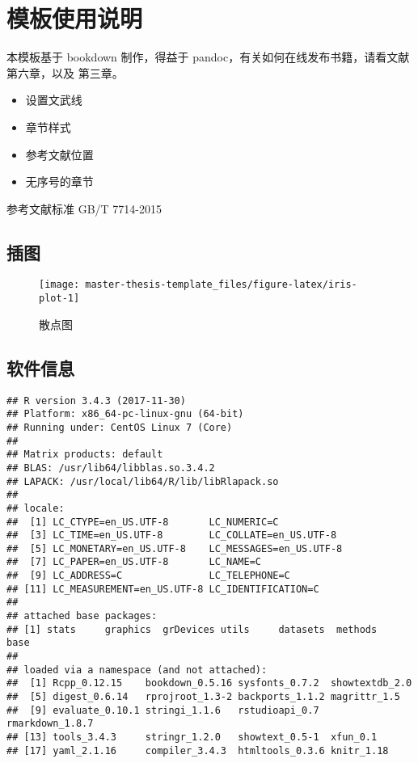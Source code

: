 \documentclass[a4paper,11pt,]{ctexbook}
\date{}
\providecommand{\tightlist}{%
  \setlength{\itemsep}{0pt}\setlength{\parskip}{0pt}}
\theoremstyle{definition}
\theoremstyle{definition}
\theoremstyle{definition}
\theoremstyle{remark}
\begin{document}
{
\setcounter{tocdepth}{2}
\tableofcontents
}
\chapter{模板使用说明}

本模板基于 bookdown 制作，得益于 pandoc，有关如何在线发布书籍，请看文献
\citep{bookdown2016CRC} 第六章，以及 \citep{blogdown2017CRC} 第三章。

\begin{itemize}
\tightlist
\item
  设置文武线
\item
  章节样式
\item
  参考文献位置
\item
  无序号的章节
\end{itemize}

参考文献标准 GB/T 7714-2015

\section{插图}

\begin{figure}

{\centering \texttt{[image: master-thesis-template\_files/figure-latex/iris-plot-1]} 

}

\caption{散点图}\label{fig:iris-plot}
\end{figure}

\section{软件信息}

\begin{verbatim}
## R version 3.4.3 (2017-11-30)
## Platform: x86_64-pc-linux-gnu (64-bit)
## Running under: CentOS Linux 7 (Core)
## 
## Matrix products: default
## BLAS: /usr/lib64/libblas.so.3.4.2
## LAPACK: /usr/local/lib64/R/lib/libRlapack.so
## 
## locale:
##  [1] LC_CTYPE=en_US.UTF-8       LC_NUMERIC=C              
##  [3] LC_TIME=en_US.UTF-8        LC_COLLATE=en_US.UTF-8    
##  [5] LC_MONETARY=en_US.UTF-8    LC_MESSAGES=en_US.UTF-8   
##  [7] LC_PAPER=en_US.UTF-8       LC_NAME=C                 
##  [9] LC_ADDRESS=C               LC_TELEPHONE=C            
## [11] LC_MEASUREMENT=en_US.UTF-8 LC_IDENTIFICATION=C       
## 
## attached base packages:
## [1] stats     graphics  grDevices utils     datasets  methods   base     
## 
## loaded via a namespace (and not attached):
##  [1] Rcpp_0.12.15    bookdown_0.5.16 sysfonts_0.7.2  showtextdb_2.0 
##  [5] digest_0.6.14   rprojroot_1.3-2 backports_1.1.2 magrittr_1.5   
##  [9] evaluate_0.10.1 stringi_1.1.6   rstudioapi_0.7  rmarkdown_1.8.7
## [13] tools_3.4.3     stringr_1.2.0   showtext_0.5-1  xfun_0.1       
## [17] yaml_2.1.16     compiler_3.4.3  htmltools_0.3.6 knitr_1.18
\end{verbatim}
\end{document}

